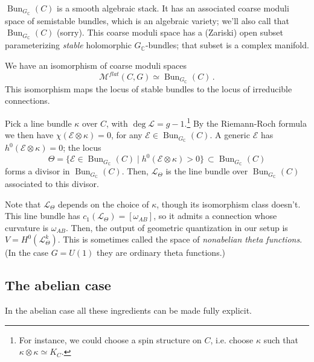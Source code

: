 \documentclass[12pt,letterpaper,reqno]{amsart}
\numberwithin{equation}{section}
\newcommand{\cL}{\ensuremath{\mathcal L}}
\newcommand{\cM}{\ensuremath{\mathcal M}}
\newcommand{\bbC}{\ensuremath{\mathbb C}}
\newcommand{\cE}{{\mathcal E}}
\newcommand{\ti}[1]{\textit{#1}}
\DeclareMathOperator{\Bun}{Bun}
\DeclareRobustCommand{\fixme}[1]{\leavevmode{\color{orange}[#1]}}
\begin{document}
$\Bun_{G_\bbC}(C)$ is a smooth algebraic stack. It has an associated
coarse moduli space of semistable bundles, which is an algebraic variety; we'll also call that $\Bun_{G_\bbC}(C)$
(sorry). This coarse moduli space has a (Zariski) open subset parameterizing \ti{stable} holomorphic
$G_\bbC$-bundles; that subset is a complex manifold. \fixme{add refs}

\begin{thm}
We have an isomorphism of coarse moduli spaces
\begin{equation}
 \cM^{flat}(C,G) \simeq \Bun_{G_\bbC}(C) \, .
\end{equation}
This isomorphism maps the locus of stable bundles to the locus of irreducible connections.
\end{thm}

\begin{defn}
Pick a line bundle $\kappa$ over $C$, with $\deg \cL = g-1$.\footnote{For instance, we could choose a spin structure on $C$, i.e. choose $\kappa$ such that $\kappa \otimes \kappa \simeq K_C$.}
By the Riemann-Roch formula we then have $\chi(\cE \otimes \kappa) = 0$,
for any $\cE \in \Bun_{G_\bbC}(C)$. A generic $\cE$ has $h^0(\cE \otimes \kappa) = 0$;
the locus
\begin{equation}
  \Theta = \{ \cE \in \Bun_{G_\bbC}(C) \mid h^0(\cE \otimes \kappa) > 0 \} \, \subset \Bun_{G_\bbC}(C)
\end{equation}
forms a divisor in $\Bun_{G_\bbC}(C)$.
Then, $\cL_\Theta$ is the line bundle over $\Bun_{G_\bbC}(C)$ associated to this divisor.
\end{defn}

Note that $\cL_\Theta$ depends on the choice of $\kappa$, though its isomorphism class doesn't.
This line bundle has $c_1(\cL_\Theta) = [\omega_{AB}]$, so it admits a connection whose curvature is $\omega_{AB}$.
Then, the output of geometric quantization in our setup is $V = H^0(\cL_\Theta^k)$.
This is sometimes called the space of \ti{nonabelian theta functions}. (In the case $G = U(1)$ they are
ordinary theta functions.)


\subsection{The abelian case}

In the abelian case all these ingredients can be made fully explicit.
\end{document}
